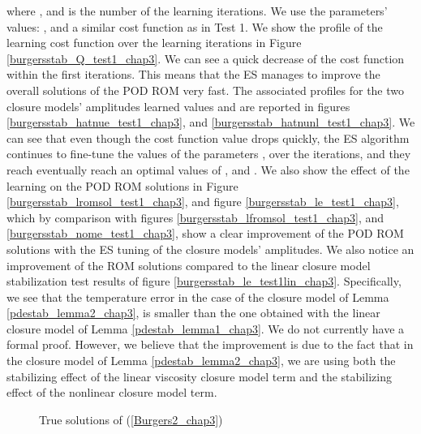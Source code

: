 \documentclass[letterpaper,conference,onecolumn,11pt]{IEEEtran}
\begin{document}
where , and  is the number of
the learning iterations. We use the parameters' values:
, and a similar
cost function as in Test 1. We show the profile of the learning
cost function over the learning iterations in Figure
\ref{burgersstab_Q_test1_chap3}. We can see a quick decrease of
the cost function within the first  iterations. This means
that the ES manages to improve the overall solutions of the POD
ROM very fast. The associated profiles for the two closure models'
amplitudes learned values  and  are
reported in figures \ref{burgersstab_hatnue_test1_chap3}, and
\ref{burgersstab_hatnunl_test1_chap3}. We can see that even though
the cost function value drops quickly, the ES algorithm continues
to fine-tune the values of the parameters ,
 over the iterations, and they reach eventually
reach an optimal values of , and
. We also show the effect of the
learning on the POD ROM solutions in Figure
\ref{burgersstab_lromsol_test1_chap3}, and figure
\ref{burgersstab_le_test1_chap3}, which by comparison with figures
\ref{burgersstab_lfromsol_test1_chap3}, and
\ref{burgersstab_nome_test1_chap3}, show a clear improvement of
the POD ROM solutions with the ES tuning of the closure models'
amplitudes. We also notice an improvement of the ROM solutions
compared to the linear closure model stabilization test results of
figure  \ref{burgersstab_le_test1lin_chap3}. Specifically, we see
that the temperature error in the case of the closure model of
Lemma \ref{pdestab_lemma2_chap3}, is smaller than the one obtained
with the linear closure model of Lemma \ref{pdestab_lemma1_chap3}.
We do not currently have a formal proof. However, we believe that
the improvement is due to the fact that in the closure model of
Lemma \ref{pdestab_lemma2_chap3}, we are using both the
stabilizing effect of the linear viscosity closure model term and
the stabilizing effect of the nonlinear closure model term.


\begin{figure}\center
  \begin{minipage}{0.4\linewidth}
 \center{}
  \end{minipage}
  \hfill
  \begin{minipage}{0.4\linewidth}
   \center{}
  \end{minipage}
  \caption{True solutions of (\ref{Burgers2_chap3})}
  \label{burgersstab_truesol_test1_chap3}
\end{figure}
\end{document}
